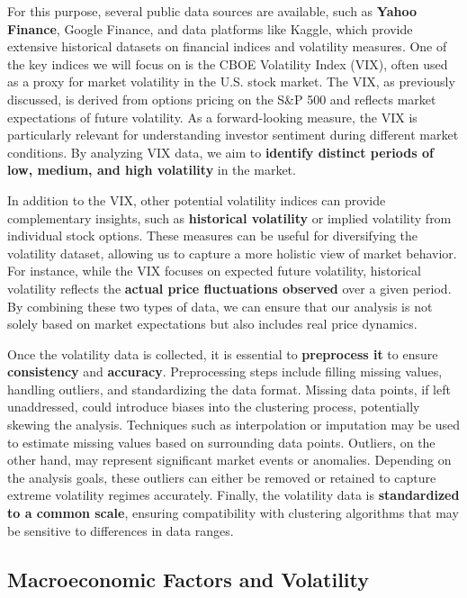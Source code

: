 For this purpose, several public data sources are available, such as \textbf{Yahoo Finance}, Google Finance, and data platforms like Kaggle, which provide extensive historical datasets on financial indices and volatility measures. One of the key indices we will focus on is the CBOE Volatility Index (VIX), often used as a proxy for market volatility in the U.S. stock market. The VIX, as previously discussed, is derived from options pricing on the S\&P 500 and reflects market expectations of future volatility. As a forward-looking measure, the VIX is particularly relevant for understanding investor sentiment during different market conditions. By analyzing VIX data, we aim to \textbf{identify distinct periods of low, medium, and high volatility} in the market.

In addition to the VIX, other potential volatility indices can provide complementary insights, such as \textbf{historical volatility} or implied volatility from individual stock options. These measures can be useful for diversifying the volatility dataset, allowing us to capture a more holistic view of market behavior. For instance, while the VIX focuses on expected future volatility, historical volatility reflects the \textbf{actual price fluctuations observed} over a given period. By combining these two types of data, we can ensure that our analysis is not solely based on market expectations but also includes real price dynamics.

Once the volatility data is collected, it is essential to \textbf{preprocess it} to ensure \textbf{consistency} and \textbf{accuracy}. Preprocessing steps include filling missing values, handling outliers, and standardizing the data format. Missing data points, if left unaddressed, could introduce biases into the clustering process, potentially skewing the analysis. Techniques such as interpolation or imputation may be used to estimate missing values based on surrounding data points. Outliers, on the other hand, may represent significant market events or anomalies. Depending on the analysis goals, these outliers can either be removed or retained to capture extreme volatility regimes accurately. Finally, the volatility data is \textbf{standardized to a common scale}, ensuring compatibility with clustering algorithms that may be sensitive to differences in data ranges.


\subsection{Macroeconomic Factors and Volatility}

